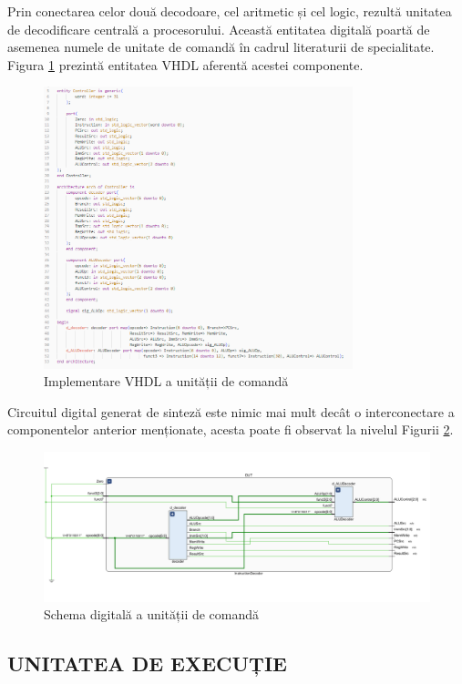 \documentclass[12pt]{article}
\begin{document}
Prin conectarea celor două decodoare, cel aritmetic și cel logic, rezultă unitatea de decodificare centrală a procesorului. Această entitatea digitală poartă de asemenea numele de unitate de comandă în cadrul literaturii de specialitate. Figura \ref{Figura:48} prezintă entitatea VHDL aferentă acestei componente.

  \begin{figure}[h!]
 \includegraphics[width=0.8\textwidth]{controllervhdl.png}
 \centering
 \caption{Implementare VHDL a unității de comandă}
 \label{Figura:48}
 \end{figure}
 
Circuitul digital generat de sinteză este nimic mai mult decât o interconectare a componentelor anterior menționate, acesta poate fi observat la nivelul Figurii \ref{Figura:49}. 
 
 \begin{figure}[h!]
 \includegraphics[width=1.05\textwidth]{controller.png}\centering
 \caption{Schema digitală a unității de comandă}
 \label{Figura:49}
 \end{figure}
 
\subsection{UNITATEA DE EXECUȚIE} 
\end{document}
